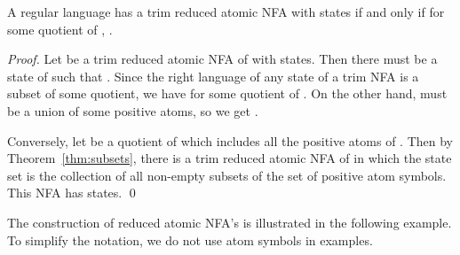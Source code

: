 \documentclass{llncs}
\begin{document}
\begin{theorem}
\label{thm:maximal}
A regular language  has a trim reduced atomic NFA with  states if and 
only if for some quotient  of , .
\end{theorem}

\begin{proof}
Let  be a trim reduced atomic NFA of  
with  states. Then there must be a state  of  such that
. Since the right language of any state 
of a trim NFA is a subset of some quotient, we have
 for some
quotient  of .
On the other hand,  must be a union of some positive atoms, 
so we get .

Conversely, let  be a quotient of 
which includes all the positive atoms of . Then 
by Theorem~\ref{thm:subsets}, there is a trim reduced atomic NFA of 
in which the state set is the collection of all non-empty subsets of the set 
of positive atom symbols. This NFA has  states. 
\qed
\end{proof} 




The construction of reduced atomic NFA's is illustrated in the following example.
To simplify the notation, we do not use atom symbols in examples.
\end{document}
